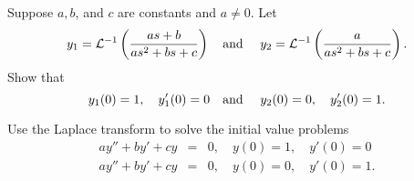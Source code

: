 \documentclass{ximera}
\begin{document}
\begin{problem}\label{exer:8.3.38}
Suppose $a,b$, and $c$ are constants and $a\ne0$.  Let
$$
y_1={\cal L}^{-1}\left(as+b\over as^2+bs+c\right)\mbox{\quad and \quad}
y_2={\cal L}^{-1}\left(a\over as^2+bs+c\right).
$$
Show that
$$
y_1(0)=1,\quad y_1'(0)=0\mbox{\quad and \quad} y_2(0)=0,\quad y_2'(0)=1.
$$
\begin{hint}
Use the Laplace transform to solve the initial value
problems
\begin{eqnarray*}
ay''+by'+cy&=&0, \quad   y(0)=1,\quad y'(0)=0 \\
ay''+by'+cy&=&0, \quad  y(0)=0,\quad y'(0)=1.
\end{eqnarray*}
\end{hint}
\end{problem}
\end{document}
